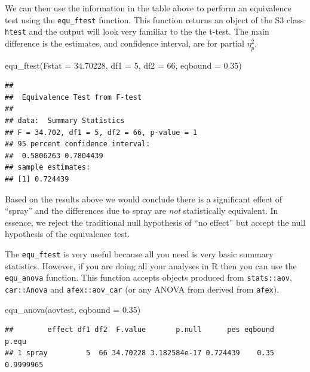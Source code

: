 \documentclass[]{interact}
\theoremstyle{plain}%
\theoremstyle{definition}
\theoremstyle{remark}
\newenvironment{Shaded}{\begin{snugshade}}{\end{snugshade}}
\newcommand{\AttributeTok}[1]{\textcolor[rgb]{0.77,0.63,0.00}{#1}}
\newcommand{\DecValTok}[1]{\textcolor[rgb]{0.00,0.00,0.81}{#1}}
\newcommand{\FloatTok}[1]{\textcolor[rgb]{0.00,0.00,0.81}{#1}}
\newcommand{\FunctionTok}[1]{\textcolor[rgb]{0.00,0.00,0.00}{#1}}
\newcommand{\NormalTok}[1]{#1}
\begin{document}
We can then use the information in the table above to perform an
equivalence test using the \texttt{equ\_ftest} function. This function
returns an object of the S3 class \texttt{htest} and the output will
look very familiar to the the t-test. The main difference is the
estimates, and confidence interval, are for partial \(\eta^2_p\).

\begin{Shaded}
\begin{Highlighting}[]
\FunctionTok{equ\_ftest}\NormalTok{(}\AttributeTok{Fstat =} \FloatTok{34.70228}\NormalTok{,}
          \AttributeTok{df1 =} \DecValTok{5}\NormalTok{,}
          \AttributeTok{df2 =} \DecValTok{66}\NormalTok{,}
          \AttributeTok{eqbound =} \FloatTok{0.35}\NormalTok{)}
\end{Highlighting}
\end{Shaded}

\begin{verbatim}
## 
##  Equivalence Test from F-test
## 
## data:  Summary Statistics
## F = 34.702, df1 = 5, df2 = 66, p-value = 1
## 95 percent confidence interval:
##  0.5806263 0.7804439
## sample estimates:
## [1] 0.724439
\end{verbatim}

Based on the results above we would conclude there is a significant
effect of ``spray'' and the differences due to spray are \emph{not}
statistically equivalent. In essence, we reject the traditional null
hypothesis of ``no effect'' but accept the null hypothesis of the
equivalence test.

The \texttt{equ\_ftest} is very useful because all you need is very
basic summary statistics. However, if you are doing all your analyses in
R then you can use the \texttt{equ\_anova} function. This function
accepts objects produced from \texttt{stats::aov}, \texttt{car::Anova}
and \texttt{afex::aov\_car} (or any ANOVA from derived from
\texttt{afex}).

\begin{Shaded}
\begin{Highlighting}[]
\FunctionTok{equ\_anova}\NormalTok{(aovtest,}
          \AttributeTok{eqbound =} \FloatTok{0.35}\NormalTok{)}
\end{Highlighting}
\end{Shaded}

\begin{verbatim}
##        effect df1 df2  F.value       p.null      pes eqbound     p.equ
## 1 spray         5  66 34.70228 3.182584e-17 0.724439    0.35 0.9999965
\end{verbatim}
\end{document}
